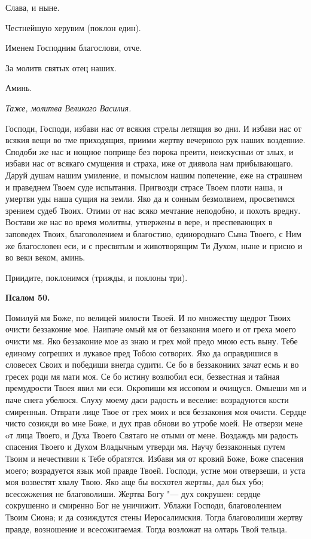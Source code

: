 Слава, и ныне.

Честнейшую херувим (поклон един).

Именем Господним благослови, отче.

За молитв святых отец наших. 

Аминь.


\itshape Таже, молитва Великаго Василия.\normalfont{}

Господи, Господи, избави нас от всякия стрелы летящия во дни. И избави нас от всякия вещи во тме приходящия, приими жертву вечернюю рук наших воздеяние. Сподоби же нас и нощное поприще без порока преити, неискусныи от злых, и избави нас от всякаго смущения и страха, иже от диявола нам прибывающаго. Даруй душам нашим умиление, и помыслом нашим попечение, еже на страшнем и праведнем Твоем суде испытания. Пригвозди страсе Твоем плоти наша, и умертви уды наша сущия на земли. Яко да и сонным безмолвием, просветимся зрением судеб Твоих. Отими от нас всяко мечтание неподобно, и похоть вредну. Востави же нас во время молитвы, утвержены в вере, и преспевающих в заповедех Твоих, благоволением и благостию, единороднаго Сына Твоего, с Ним же благословен еси, и с пресвятым и животворящим Ти Духом, ныне и присно и во веки веком, аминь.

Приидите, поклонимся (трижды, и поклоны три).


\medskip


\bfseries Псалом 50.\normalfont{}\nopagebreak


Помилуй мя Боже, по велицей милости Твоей. И по множеству щедрот Твоих очисти беззаконие мое. Наипаче омый мя от беззакония моего и от греха моего очисти мя. Яко беззаконие мое аз знаю и грех мой предо мною есть выну. Тебе единому согреших и лукавое пред Тобою сотворих. Яко да оправдишися в словесех Своих и победиши внегда судити. Се бо в беззакониих зачат есмь и во гресех роди мя мати моя. Се бо истину возлюбил еси, безвестная и тайная премудрости Твоея явил ми еси. Окропиши мя иссопом и очищуся. Омыеши мя и паче снега убелюся. Слуху моему даси радость и веселие: возрадуются кости смиренныя. Отврати лице Твое от грех моих и вся  беззакония моя очисти. Сердце чисто созижди во мне Боже, и дух прав обнови во утробе моей. Не отверзи мене oт лица Твоего, и Духа Твоего Святаго не отыми от мене. Воздаждь ми радость спасения Твоего и Духом Владычным утверди мя. Научу беззаконныя путем Твоим и нечестивии к Тебе обратятся. Избави мя от кровий Боже, Боже спасения моего; возрадуется язык мой правде Твоей. Господи, устне мои отверзеши, и уста моя возвестят хвалу Твою. Яко аще бы восхотел жертвы, дал бых убо; всесожжения не благоволиши. Жертва Богу "--- дух сокрушен: сердце сокрушенно и смиренно Бог не уничижит. Ублажи Господи, благоволением Твоим Сиона; и да созиждутся стены Иеросалимския. Тогда благоволиши жертву правде, возношение и всесожигаемая. Тогда возложат на олтарь Твой тельца.



